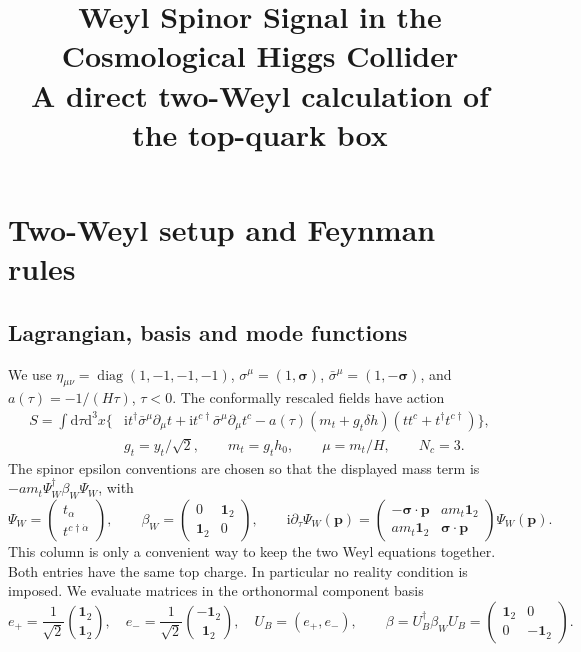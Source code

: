 \documentclass[a4paper,12pt]{article}
\title{\Large\textbf{Weyl Spinor Signal in the Cosmological Higgs Collider}\\[2mm]
\large A direct two-Weyl calculation of the top-quark box}
\author{}
\newcommand{\ii}{\mathrm i}
\newcommand{\dd}{\mathrm d}
\newcommand{\bs}{\bm\sigma}
\newcommand{\one}{\mathbf1_2}
\begin{document}
\date{}
\maketitle


\section{Two-Weyl setup and Feynman rules}
\subsection{Lagrangian, basis and mode functions}
We use $\eta_{\mu\nu}=\operatorname{diag}(1,-1,-1,-1)$,
$\sigma^\mu=(1,\bs)$, $\bar\sigma^\mu=(1,-\bs)$, and
$a(\tau)=-1/(H\tau)$, $\tau<0$. The conformally rescaled fields have action
\begin{align}
 S=\int\dd\tau\dd^3x\big\{&\ii t^\dagger\bar\sigma^\mu\partial_\mu t
 +\ii t^{c\dagger}\bar\sigma^\mu\partial_\mu t^c
 -a(\tau)(m_t+g_t\delta h)(tt^c+t^\dagger t^{c\dagger})\big\},\\
 &g_t=y_t/\sqrt2,\qquad m_t=g_t h_0,\qquad \mu=m_t/H,\qquad N_c=3.
 \label{eq:action}
\end{align}
The spinor epsilon conventions are chosen so that the displayed mass term is
$-a m_t\Psi_W^\dagger\beta_W\Psi_W$, with
\begin{equation}
 \Psi_W=\begin{pmatrix}t_\alpha\\t^{c\dagger\dot\alpha}\end{pmatrix},\qquad
 \beta_W=\begin{pmatrix}0&\one\\\one&0\end{pmatrix},\qquad
 \ii\partial_\tau\Psi_W(\bm p)
 =\begin{pmatrix}-\bs\cdot\bm p&a m_t\one\\a m_t\one&\bs\cdot\bm p\end{pmatrix}\Psi_W(\bm p).
 \label{eq:weyl-eom}
\end{equation}
This column is only a convenient way to keep the two Weyl equations together.
Both entries have the same top charge. In particular no reality condition is imposed.
We evaluate matrices in the orthonormal component basis
\begin{equation}
 e_+=\frac1{\sqrt2}\binom{\one}{\one},\quad
 e_-=\frac1{\sqrt2}\binom{-\one}{\one},\quad
 U_B=(e_+,e_-),\qquad
 \beta=U_B^\dagger\beta_W U_B=\begin{pmatrix}\one&0\\0&-\one\end{pmatrix}.
\end{equation}
\end{document}
